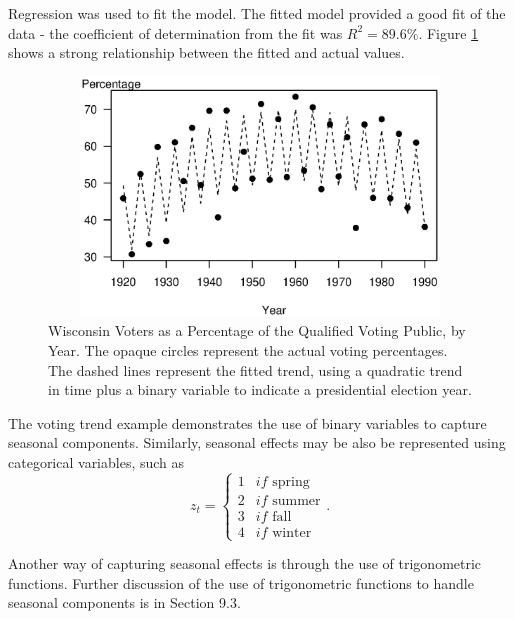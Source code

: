 Regression was used to fit the model. The fitted model provided a
good fit of the data - the coefficient of determination from the fit
was $R^2=89.6\%.$ Figure \ref{F7:WiscVotes} shows a strong
relationship between the fitted and actual values.

\begin{figure}[htp]
  \begin{center}
    \includegraphics[height=2.5in, width=4.5in]{Chapter7Trend/WiscVotes.eps}
    \caption{\label{F7:WiscVotes} \small Wisconsin
Voters as a Percentage of the Qualified Voting Public, by Year. The
opaque circles represent the actual voting percentages. The dashed
lines represent the fitted trend, using a quadratic trend in time
plus a binary variable to indicate a presidential election year.}
  \end{center}
\end{figure}

\linejed

The voting trend example demonstrates the use of binary variables to
capture seasonal components. Similarly, seasonal effects may be also
be represented using categorical variables, such as
\begin{equation*}
z_t=\left\{
\begin{array}{ll}
1 & if\text{~spring} \\
2 & if\text{~summer} \\
3 & if\text{~fall} \\
4 & if\text{~winter}%
\end{array}%
\right. .
\end{equation*}

Another way of capturing seasonal effects is through the use of
trigonometric functions. Further discussion of the use of trigonometric
functions to handle seasonal components is in Section 9.3.


